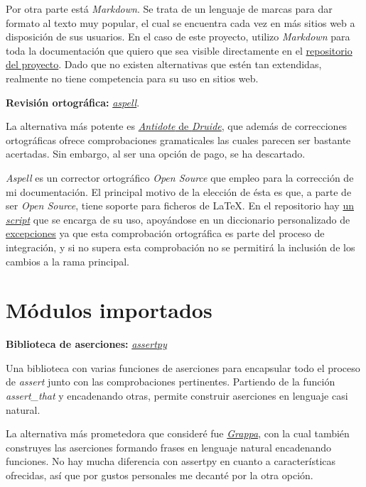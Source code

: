 Por otra parte está \textit{Markdown}. Se trata de un lenguaje de marcas para dar formato al texto muy popular, el cual se encuentra cada vez en más sitios web a disposición de sus usuarios. En el caso de este proyecto, utilizo \textit{Markdown} para toda la documentación que quiero que sea visible directamente en el \href{https://github.com/Anglepi/My-Many-Reads}{repositorio del proyecto}. Dado que no existen alternativas que estén tan extendidas, realmente no tiene competencia para su uso en sitios web.

\textbf{Revisión ortográfica:} \href{http://aspell.net/}{\textit{aspell}}.

La alternativa más potente es \href{https://www.antidote.info/en/}{\textit{Antidote} de \textit{Druide}}, que además de correcciones ortográficas ofrece comprobaciones gramaticales las cuales parecen ser bastante acertadas. Sin embargo, al ser una opción de pago, se ha descartado.

\textit{Aspell} es un corrector ortográfico \textit{Open Source} que empleo para la corrección de mi documentación. El principal motivo de la elección de ésta es que, a parte de ser \textit{Open Source}, tiene soporte para ficheros de LaTeX. En el repositorio hay \href{https://github.com/Anglepi/My-Many-Reads/blob/main/scripts/spellcheck.sh}{un \textit{script}} que se encarga de su uso, apoyándose en un diccionario personalizado de \href{https://github.com/Anglepi/My-Many-Reads/blob/main/scripts/spellcheckDictionary.txt}{excepciones} ya que esta comprobación ortográfica es parte del proceso de integración, y si no supera esta comprobación no se permitirá la inclusión de los cambios a la rama principal.


\section{Módulos importados}

\textbf{Biblioteca de aserciones:} \href{https://github.com/assertpy/assertpy}{\textit{assertpy}}

Una biblioteca con varias funciones de aserciones para encapsular todo el proceso de \textit{assert} junto con las comprobaciones pertinentes. Partiendo de la función \textit{assert\_that} y encadenando otras, permite construir aserciones en lenguaje casi natural.

La alternativa más prometedora que consideré fue \href{https://github.com/grappa-py/grappa}{\textit{Grappa}}, con la cual también construyes las aserciones formando frases en lenguaje natural encadenando funciones. No hay mucha diferencia con assertpy en cuanto a características ofrecidas, así que por gustos personales me decanté por la otra opción.


